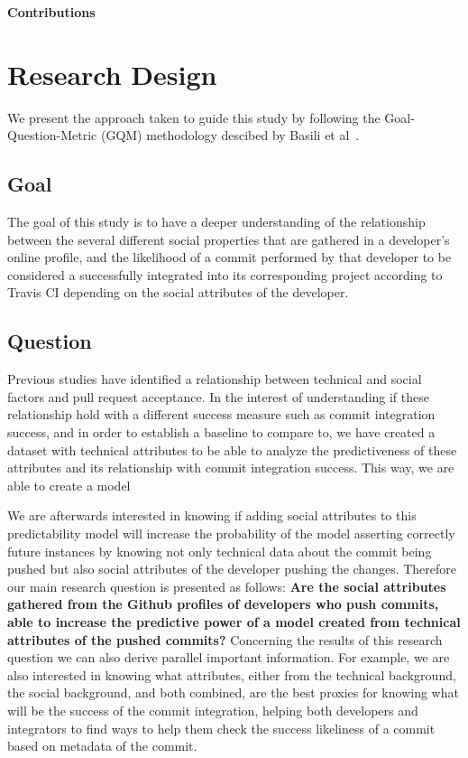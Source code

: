 \documentclass[10pt, conference]{IEEEtran}
\newcommand{\todo}[1]
  {{\scriptsize \textbf{\color{red} {#1}}}}
\begin{document}
\todo{Contributions}

\section{Research Design}
We present the approach taken to guide this study by
following the Goal-Question-Metric (GQM) methodology descibed by Basili et 
al~\cite{Basili84}.

\subsection{Goal}
The goal of this study is to have a deeper understanding of the relationship 
between the several different social properties that are gathered in a 
developer's online profile, and the likelihood of a commit performed by that 
developer to be considered a successfully integrated into its corresponding 
project according to Travis CI depending on the social attributes of the 
developer.


\subsection{Question}

Previous studies have identified a relationship between technical and social 
factors and pull request acceptance. In the interest of understanding if these 
relationship hold with a different success measure such as commit 
integration success, and in order to establish a baseline to compare to, we have created a dataset with technical attributes to be able to analyze the predictiveness of these attributes and its relationship with commit integration success. This way, we are able to create a model

We are afterwards interested in knowing if adding social attributes to this 
predictability model will increase the probability of the model asserting 
correctly future instances by knowing not only technical data about the commit 
being pushed but also social attributes of the developer pushing the changes. Therefore our main research question is presented as follows:
\newline \newline
\textbf{Are the social attributes gathered 
from the Github profiles of developers who push commits, able to 
increase the predictive power of a model created from technical attributes of the pushed commits?}
\newline \newline
Concerning the results of this research question we can also derive parallel important information. For example, we are also interested in knowing what attributes, either from the technical 
background, the social background, and both combined, are the best proxies for 
knowing what will be the success of the commit integration, helping both developers and integrators to find ways to help them check the success likeliness of a commit based on metadata of the commit.  
\end{document}
